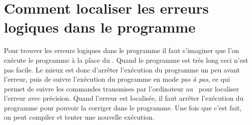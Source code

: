 \section{Comment localiser les erreurs logiques dans le programme} 

Pour trouver les erreurs logiques dans le programme il faut s'imaginer
que l'on exécute le programme à la place du \robotErr. Quand le programme 
est très long ceci n'est pas facile.
Le mieux est donc d'arrêter l'exécution du programme un peu avant
l'erreur, puis de sui\-vre l'exécution du programme en mode {\em pas à pas},
ce qui permet de suivre les commandes transmises par l'or\-di\-na\-teur au \robotErr\ pour localiser l'erreur avec précision. Quand l'erreur est
localisée, il faut arrêter l'exécution
du programme pour pouvoir la corriger dans le programme. Une fois
que c'est fait, on peut compiler et tenter une nouvelle
exécution.
